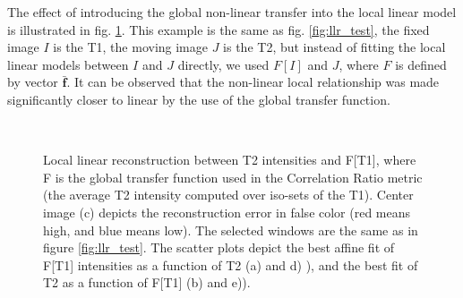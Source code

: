 The effect of introducing the global non-linear transfer into the local linear model is illustrated in fig. \ref{fig:ecc_test_good}. This example is the same as fig. \ref{fig:llr_test}, the fixed image $I$ is the T1, the moving image $J$ is the T2, but instead of fitting the local linear models between $I$ and $J$ directly, we used $F[I]$ and $J$, where $F$ is defined by vector $\mathbf{\bar{f}}$. It can be observed that the non-linear local relationship was made significantly closer to linear by the use of the global transfer function.
\begin{figure}[t]
\centering
    \\
    \caption{Local linear reconstruction between T2 intensities and F[T1], where F is the global transfer function used in the Correlation Ratio metric (the average T2 intensity computed over iso-sets of the T1). Center image (c) depicts the reconstruction error in false color (red means high, and blue means low). The selected windows are the same as in figure \ref{fig:llr_test}. The scatter plots depict the best affine fit of F[T1] intensities as a function of T2 (a) and d) ), and the best fit of T2 as a function of F[T1] (b) and e)).}
\label{fig:ecc_test_good}
\end{figure}
